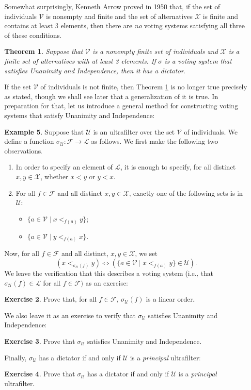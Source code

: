 \documentclass[a4paper]{memoir}
\newtheorem{theorem}{Theorem}[section]
\theoremstyle{definition}
\newtheorem{exercise}[theorem]{Exercise}
\newtheorem{example}[theorem]{Example}
\newcommand{\mc}{\mathcal}
\newcommand{\ra}{\rightarrow}
\begin{document}
Somewhat surprisingly, Kenneth Arrow proved in 1950 that, if the set of individuals 
$\mc{V}$ is nonempty and finite and the set of alternatives $\mc{X}$ is finite and contains 
at least 3 elements, then there are \emph{no} voting systems satisfying all three of these conditions.

\begin{theorem} \label{thm: arrow}
  Suppose that $\mc{V}$ is a nonempty finite set of individuals and $\mc{X}$ is a finite set of 
  alternatives with at least 3 elements. If $\sigma$ is a voting system that satisfies 
  Unanimity and Independence, then it has a dictator.
\end{theorem}

If the set $\mc{V}$ of individuals is not finite, then Theorem \ref{thm: arrow} is no longer 
true precisely as stated, though we shall see later that a generalization of it is true. In 
preparation for that, let us introduce a general method for constructing voting systems 
that satisfy Unanimity and Independence:

\begin{example}
  Suppose that $\mc{U}$ is an ultrafilter over the set $\mc{V}$ of individuals. We define a 
  function $\sigma_{\mc{U}} : \mc{F} \ra \mc{L}$ as follows. We first make the following two 
  observations.
  \begin{enumerate}
    \item In order to specify an element of $\mc{L}$, it is enough to specify, for all distinct 
    $x,y \in \mc{X}$, whether $x < y$ or $y < x$.
    \item For all $f \in \mc{F}$ and all distinct $x,y \in \mc{X}$, exactly one of the following 
    sets is in $\mc{U}$:
    \begin{itemize}
      \item $\{a \in \mc{V} \mid x <_{f(a)} y\}$;
      \item $\{a \in \mc{V} \mid y <_{f(a)} x\}$.
    \end{itemize}
  \end{enumerate}
  Now, for all $f \in \mc{F}$ and all distinct, $x,y \in \mc{X}$, we set
  \[
    (x <_{\sigma_{\mc{U}}(f)} y) \Longleftrightarrow (\{a \in \mc{V} \mid x <_{f(a)} y\} \in \mc{U}).
  \]
  We leave the verification that this describes a voting system (i.e., that $\sigma_{\mc{U}}(f) \in 
  \mc{L}$ for all $f \in \mc{F})$ as an exercise:
  \begin{exercise}
    Prove that, for all $f \in \mc{F}$, $\sigma_{\mc{U}}(f)$ is a linear order.
  \end{exercise}
  We also leave it as an exercise to verify that $\sigma_{\mc{U}}$ satisfies Unanimity and 
  Independence:
  \begin{exercise}
    Prove that $\sigma_{\mc{U}}$ satisfies Unanimity and Independence.
  \end{exercise}
  Finally, $\sigma_{\mc{U}}$ has a dictator if and only if $\mc{U}$ is a \emph{principal} ultrafilter:
  \begin{exercise}
    Prove that $\sigma_{\mc{U}}$ has a dictator if and only if $\mc{U}$ is a \emph{principal} 
    ultrafilter.
  \end{exercise}
\end{example}
\end{document}

